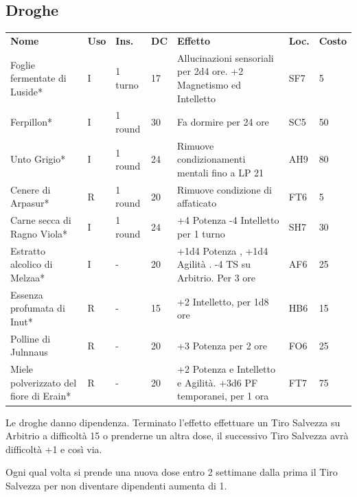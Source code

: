 \documentclass[a4paper,11pt,twoside,openany]{book}
\begin{document}
\bigskip

\subsection{Droghe}

\begin{tabularx}{0.95\textwidth}{XlllXll}
\textbf{Nome}  & \textbf{Uso} & \textbf{Ins.} & \textbf{DC} & \textbf{Effetto}& \textbf{Loc.} & \textbf{Costo} \\
Foglie fermentate di Luside*\index{Foglie fermentate di Luside}  & I  & 1 turno  & 17& Allucinazioni sensoriali per 2d4 ore. +2 Magnetismo ed Intelletto & SF7 & 5    \\
Ferpillon{*} \index{Ferpillon}& I  & 1 round   & 30& Fa dormire per 24 ore& SC5 & 50   \\
Unto Grigio{*} \index{Unto Grigio} & I  & 1 round   & 24& Rimuove condizionamenti mentali fino a LP 21  & AH9 & 80   \\
Cenere di Arpasur{*} \index{Cenere di Arpasur}    & R  & 1 round   & 20& Rimuove condizione di affaticato    & FT6 & 5    \\
Carne secca di Ragno Viola* \index{Carne secca di Ragno Viola}   & I  & 1 round   & 24& +4 Potenza -4 Intelletto per 1 turno& SH7 & 30   \\
Estratto alcolico di Melzaa*\index{Estratto alcolico di Melzaa}  & I  & -    & 20& +1d4 Potenza , +1d4 Agilità . -4 TS su Arbitrio. Per 3 ore   & AF6 & 25   \\
Essenza profumata di Inut*\index{Essenza profumata do Inut} & R  & -    & 15& +2 Intelletto, per 1d8 ore& HB6 & 15   \\
Polline di Julnnaus\index{Polline di Julnnaus}{*} & R  & -    & 20& +3 Potenza per 2 ore & FO6 & 25   \\
Miele polverizzato del fiore di Erain* \index{Miele polverizzato del fiore di Erain} & R  & -    & 20& +2 Potenza e Intelletto e Agilità. +3d6 PF temporanei, per 1 ora  & FT7 & 75   \\
\end{tabularx}

\medskip

Le droghe danno dipendenza. Terminato l'effetto effettuare un Tiro Salvezza su Arbitrio a difficoltà 15 o prenderne un altra dose, il successivo Tiro Salvezza avrà difficoltà +1 e così via.

Ogni qual volta si prende una nuova dose entro 2 settimane dalla prima il Tiro Salvezza per non diventare dipendenti aumenta di 1.
\end{document}
